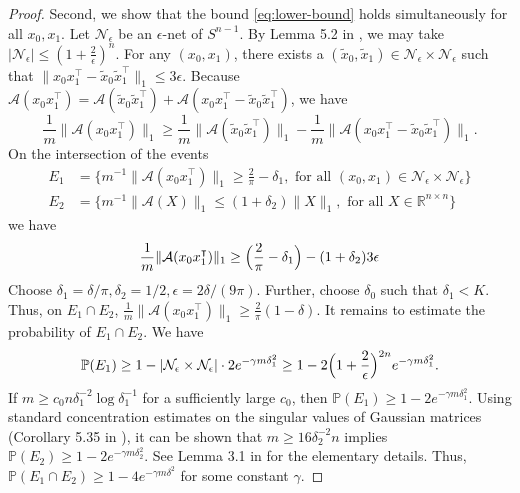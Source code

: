 \documentclass[12pt]{article}
\newcommand{\1}{\mathbf{1}}
\newcommand{\R}{\mathbb{R}}
\newcommand{\A}{\mathcal{A}}
\newcommand{\eps}{\epsilon}
\newcommand{\xtilde}{\tilde{x}}
\newcommand{\PP}{\mathbb{P}}
\begin{document}
\begin{proof}
Second, we show that the bound \eqref{eq:lower-bound} holds simultaneously for all $x_0, x_1$.  Let $\mathcal{N}_\eps$ be an $\eps$-net of $S^{n-1}$.  By Lemma 5.2 in \cite{V2012}, we may take $| \mathcal{N}_\eps| \leq (1 + \frac{2}{\eps})^n$.   For any $(x_0, x_1)$, there exists a $(\xtilde_0, \xtilde_1) \in \mathcal{N}_\eps \times \mathcal{N}_\eps$ such that 
$
\|x_0 x_1^\intercal - \xtilde_0 \xtilde_1^\intercal\|_1  
\leq 3 \eps.
$
Because $\A(x_0 x_1^\intercal) = \A(\xtilde_0 \xtilde_1^\intercal) + \A(x_0 x_1^\intercal - \xtilde_0 \xtilde_1^\intercal)$, we have
$$
\frac{1}{m}\|\A(x_0 x_1^\intercal)\|_1 \geq \frac{1}{m} \| \A(\xtilde_0 \xtilde_1^\intercal) \|_1 - \frac{1}{m}\|\A(x_0 x_1^\intercal - \xtilde_0 \xtilde_1^\intercal)\|_1.
$$
On the intersection of the events 
\begin{align*}
E_1 &= \{m^{-1} \|\A(x_0 x_1^\intercal) \|_1 \geq \frac{2}{\pi} - \delta_1, \text{ for all } (x_0, x_1) \in \mathcal{N}_\eps \times \mathcal{N}_\eps\}\\
E_2 &= \{m^{-1}\| \A(X) \|_1 \leq (1 + \delta_2) \|X\|_1, \text{ for all } X \in \R^{n \times n} \}
\end{align*}
we have
\begin{align*}
\frac{1}{m}\|\A(x_0 x_1^\intercal)\|_1  \geq \Bigl(\frac{2}{\pi} - \delta_1 \Bigr) - (1 + \delta_2)  3 \eps
\end{align*}
Choose $\delta_1 = \delta/\pi, \delta_2 = 1/2, \eps = 2\delta/(9\pi)$.  Further,  choose $\delta_0$ such that $\delta_1 < K$.    Thus,  on $E_1 \cap E_2$, $\frac{1}{m}\|\A(x_0 x_1^\intercal)\|_1  \geq \frac{2}{\pi}(1-\delta)$. It remains to estimate the probability of $E_1\cap E_2$.   We have $$\PP(E_1) \geq 1 - | \mathcal{N}_\eps \times \mathcal{N}_\eps| \cdot 2 e^{-\gamma m \delta_1^2} \geq 1 - 2 \Bigl( 1 + \frac{2}{\eps}\Bigr)^{2n} e^{- \gamma m \delta_1^2}.$$  If $m \geq c_0 n \delta
_1^{-2} \log \delta_1^{-1}$ for a sufficiently large $c_0$,  then $\PP(E_1) \geq 1 - 2 e ^{-\gamma m \delta_1^2}$.  Using standard concentration estimates on the singular values of  Gaussian matrices (Corollary 5.35 in \cite{V2012}), it can be shown that $m \geq 16 \delta_2^{-2} n$ implies $\PP(E_2) \geq 1 - 2 e^{-\gamma m \delta_2^2}$.   See Lemma 3.1 in \cite{CSV2013} for the elementary details.  Thus, $\PP(E_1 \cap E_2) \geq 1 - 4 e^{-\gamma m \delta^2}$ for some constant $\gamma$. 

\end{proof}
\end{document}

